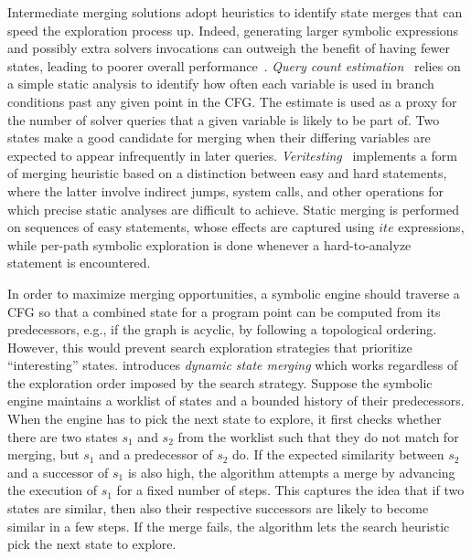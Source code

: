  Intermediate merging solutions adopt heuristics to identify state merges that can speed the exploration process up. Indeed, generating larger symbolic expressions and possibly extra solvers invocations can outweigh the benefit of having fewer states, leading to poorer overall performance~\cite{HSS-RV09,KKB-PLDI12}. {\em Query count estimation}~\cite{KKB-PLDI12} relies on a simple static analysis to identify how often each variable is used in branch conditions past any given point in the CFG. The estimate is used as a proxy for the number of solver queries that a given variable is likely to be part of. Two states make a good candidate for merging when their differing variables are expected to appear infrequently in later queries. {\em Veritesting}~\cite{VERITESTING-ICSE14} implements a form of merging heuristic based on a distinction between easy and hard statements, where the latter involve indirect jumps, system calls, and other operations for which precise static analyses are difficult to achieve. Static merging is performed on sequences of easy statements, %
whose effects are captured using $ite$ expressions, 
while per-path symbolic exploration is done whenever a hard-to-analyze statement is encountered. 


 In order to maximize merging opportunities, a symbolic engine should traverse a CFG so that a combined state for a program point can be computed from its predecessors, e.g., if the graph  is acyclic, by following a topological ordering. However, this would prevent search exploration strategies that prioritize ``interesting'' states. \cite{KKB-PLDI12} introduces {\em dynamic state merging} which works regardless of the exploration order imposed by the search strategy.
Suppose the symbolic engine maintains a worklist of states and a bounded history of their predecessors. When the engine has to pick the next state to explore, it first checks whether there are two states $s_1$ and $s_2$ from the worklist such that they do not match for merging, but $s_1$ and a predecessor of $s_2$ do. If the expected similarity between $s_2$ and a successor of $s_1$ is also high, the algorithm attempts a merge by advancing the execution of $s_1$ for a fixed number of steps. This captures the idea that if two states are similar, then also their respective successors are likely to become similar in a few steps. If the merge fails, the algorithm lets the search heuristic pick the next state to explore.

